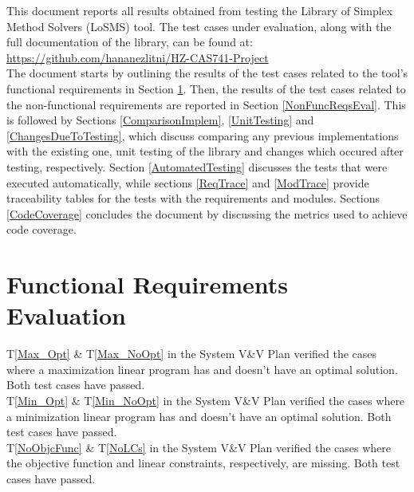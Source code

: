 \documentclass[12pt, titlepage]{article}
\newcommand{\progname}{Library of Simplex Method Solvers}
\newcommand{\famname}{LoSMS}
\begin{document}
\newpage

\tableofcontents

\listoftables %

\newpage


This document reports all results obtained from testing the \progname{} 
(\famname{}) tool. The test cases under evaluation, along with the full 
documentation of the library, can be found at: 
\url{https://github.com/hananezlitni/HZ-CAS741-Project} \\

The document starts by outlining the results of the test cases related to the 
tool's functional requirements in Section \ref{FuncReqsEval}. Then, the results 
of the test cases related to the non-functional requirements are reported in 
Section \ref{NonFuncReqsEval}. This is followed by Sections 
\ref{ComparisonImplem}, \ref{UnitTesting} and \ref{ChangesDueToTesting}, which 
discuss comparing any previous implementations with the existing one, unit 
testing of the library and changes which occured after testing, respectively. 
Section \ref{AutomatedTesting} discusses the tests that were executed 
automatically, while sections \ref{ReqTrace} and \ref{ModTrace} provide 
traceability tables for the tests with the requirements and modules. Sections 
\ref{CodeCoverage} concludes the document by discussing the metrics used to 
achieve code coverage.

\section{Functional Requirements Evaluation} \label{FuncReqsEval}

T\ref{Max_Opt} \& T\ref{Max_NoOpt} in the System V\&V Plan verified the cases 
where a maximization linear program has and doesn't have an optimal solution. 
Both test cases have passed. \\

T\ref{Min_Opt} \& T\ref{Min_NoOpt} in the System V\&V Plan verified the cases 
where a minimization linear program has and doesn't have an optimal solution. 
Both test cases have passed. \\

T\ref{NoObjcFunc} \& T\ref{NoLCs} in the System V\&V Plan verified the cases 
where the objective function and linear constraints, respectively, are missing. 
Both test cases have passed. \\
\end{document}
